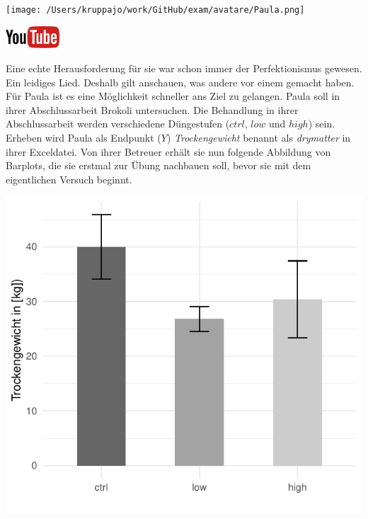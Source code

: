 \documentclass[a4paper, 9pt]{scrartcl}\usepackage[]{graphicx}\usepackage[]{xcolor}
\makeatletter
\def\maxwidth{ %
  \ifdim\Gin@nat@width>\linewidth
    \linewidth
  \else
    \Gin@nat@width
  \fi
}
\makeatother
\begin{document}
 
\begin{minipage}[t]{0.5\textwidth}
\texttt{[image: /Users/kruppajo/work/GitHub/exam/avatare/Paula.png]}
\end{minipage}
\begin{minipage}[t]{0.5\textwidth}
\hfill
\href{https://youtu.be/t0WYa_LVc5o}{\includegraphics[width = 2cm]{img/youtube}}\\[1Ex]
\end{minipage}
\vspace{1ex}



Eine echte Herausforderung für sie war schon immer der Perfektionismus gewesen. Ein leidiges Lied. Deshalb gilt anschauen, was andere vor einem gemacht haben. Für Paula ist es eine Möglichkeit schneller ans Ziel zu gelangen. Paula soll in ihrer Abschlussarbeit Brokoli untersuchen. Die Behandlung in ihrer Abschlussarbeit werden verschiedene Düngestufen ($ctrl$, $low$ und $high$) sein. Erheben wird Paula als Endpunkt ($Y$) \textit{Trockengewicht} benannt als \textit{drymatter} in ihrer Exceldatei. Von ihrer Betreuer erhält sie nun folgende Abbildung von Barplots, die sie erstmal zur Übung nachbauen soll, bevor sie mit dem eigentlichen Versuch beginnt.



{\centering \includegraphics[width=\maxwidth]{img/barplot-02-1} 

}
\end{document}

